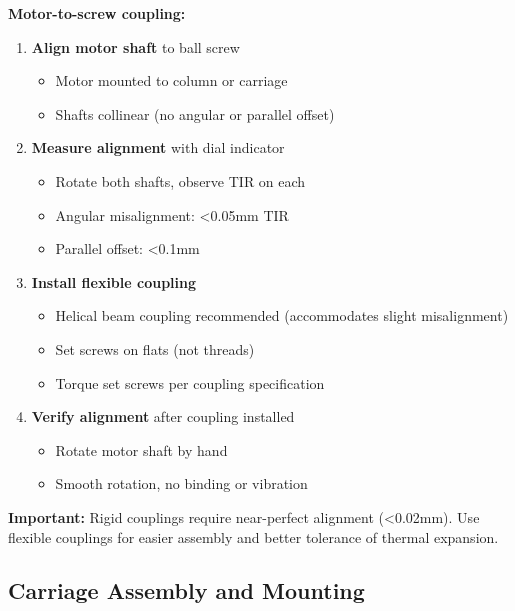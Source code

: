 \documentclass[
]{article}
\providecommand{\tightlist}{%
  \setlength{\itemsep}{0pt}\setlength{\parskip}{0pt}}
\begin{document}
\textbf{Motor-to-screw coupling:}

\begin{enumerate}
\def\labelenumi{\arabic{enumi}.}
\tightlist
\item
  \textbf{Align motor shaft} to ball screw

  \begin{itemize}
  \tightlist
  \item
    Motor mounted to column or carriage
  \item
    Shafts collinear (no angular or parallel offset)
  \end{itemize}
\item
  \textbf{Measure alignment} with dial indicator

  \begin{itemize}
  \tightlist
  \item
    Rotate both shafts, observe TIR on each
  \item
    Angular misalignment: \textless0.05mm TIR
  \item
    Parallel offset: \textless0.1mm
  \end{itemize}
\item
  \textbf{Install flexible coupling}

  \begin{itemize}
  \tightlist
  \item
    Helical beam coupling recommended (accommodates slight misalignment)
  \item
    Set screws on flats (not threads)
  \item
    Torque set screws per coupling specification
  \end{itemize}
\item
  \textbf{Verify alignment} after coupling installed

  \begin{itemize}
  \tightlist
  \item
    Rotate motor shaft by hand
  \item
    Smooth rotation, no binding or vibration
  \end{itemize}
\end{enumerate}

\textbf{Important:} Rigid couplings require near-perfect alignment
(\textless0.02mm). Use flexible couplings for easier assembly and better
tolerance of thermal expansion.

\subsection{Carriage Assembly and
Mounting}\label{carriage-assembly-and-mounting}
\end{document}
